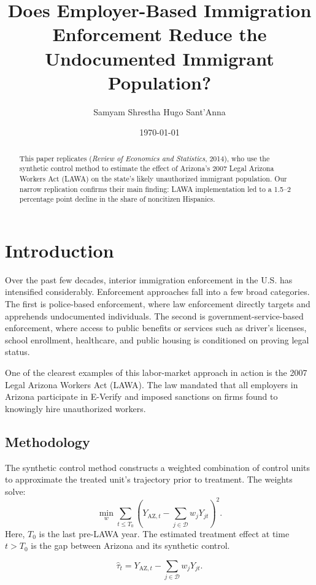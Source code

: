 \documentclass{article}
\title{Does Employer-Based Immigration Enforcement Reduce the Undocumented Immigrant Population?}
\author{Samyam Shrestha \quad Hugo Sant'Anna}
\date{\today}
\begin{document}
\maketitle

\begin{abstract}
This paper replicates \cite{bohn2014did} (\emph{Review of Economics and Statistics}, 2014), who use the synthetic control method to estimate the effect of Arizona's 2007 Legal Arizona Workers Act (LAWA) on the state's likely unauthorized immigrant population. Our narrow replication confirms their main finding: LAWA implementation led to a 1.5--2 percentage point decline in the share of noncitizen Hispanics.
\end{abstract}

\section{Introduction}
Over the past few decades, interior immigration enforcement in the U.S. has intensified considerably. Enforcement approaches fall into a few broad categories. The first is police-based enforcement, where law enforcement directly targets and apprehends undocumented individuals. The second is government-service-based enforcement, where access to public benefits or services such as driver's licenses, school enrollment, healthcare, and public housing is conditioned on proving legal status.

One of the clearest examples of this labor-market approach in action is the 2007 Legal Arizona Workers Act (LAWA). The law mandated that all employers in Arizona participate in E-Verify and imposed sanctions on firms found to knowingly hire unauthorized workers.

\subsection{Methodology}
The synthetic control method constructs a weighted combination of control units to approximate the treated unit's trajectory prior to treatment. The weights solve:
\[
  \min_{w} \sum_{t \leq T_0} \left( Y_{\text{AZ},t} - \sum_{j \in \mathcal{D}} w_j Y_{jt} \right)^2.
\]
Here, $T_0$ is the last pre-LAWA year. The estimated treatment effect at time $t > T_0$ is the gap between Arizona and its synthetic control.

\begin{equation}
  \widehat{\tau}_t = Y_{\text{AZ},t} - \sum_{j \in \mathcal{D}} w_j Y_{jt}.
  \label{eq:tau}
\end{equation}
\end{document}
